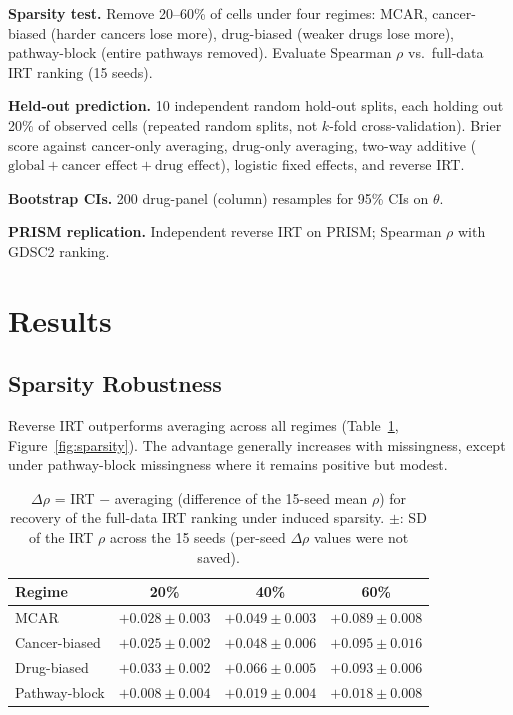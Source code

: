 \documentclass[11pt]{article}
\begin{document}
\textbf{Sparsity test.} Remove 20--60\% of cells under four regimes: MCAR, cancer-biased (harder cancers lose more), drug-biased (weaker drugs lose more), pathway-block (entire pathways removed). Evaluate Spearman $\rho$ vs.\ full-data IRT ranking (15 seeds).

\textbf{Held-out prediction.} 10 independent random hold-out splits, each holding out 20\% of observed cells (repeated random splits, not $k$-fold cross-validation). Brier score against cancer-only averaging, drug-only averaging, two-way additive ($\text{global} + \text{cancer effect} + \text{drug effect}$), logistic fixed effects, and reverse IRT.

\textbf{Bootstrap CIs.} 200 drug-panel (column) resamples for 95\% CIs on $\theta$.

\textbf{PRISM replication.} Independent reverse IRT on PRISM; Spearman $\rho$ with GDSC2 ranking.

\section{Results}

\subsection{Sparsity Robustness}

Reverse IRT outperforms averaging across all regimes (Table~\ref{tab:sparsity}, Figure~\ref{fig:sparsity}). The advantage generally increases with missingness, except under pathway-block missingness where it remains positive but modest.

\begin{table}[ht]
\centering
\caption{$\Delta\rho$ = IRT $-$ averaging (difference of the 15-seed mean $\rho$) for recovery of the full-data IRT ranking under induced sparsity. $\pm$: SD of the IRT $\rho$ across the 15 seeds (per-seed $\Delta\rho$ values were not saved).}
\label{tab:sparsity}
\small
\begin{tabular}{lccc}
\toprule
Regime & 20\% & 40\% & 60\% \\
\midrule
MCAR & $+0.028 \pm 0.003$ & $+0.049 \pm 0.003$ & $+0.089 \pm 0.008$ \\
Cancer-biased & $+0.025 \pm 0.002$ & $+0.048 \pm 0.006$ & $+0.095 \pm 0.016$ \\
Drug-biased & $+0.033 \pm 0.002$ & $+0.066 \pm 0.005$ & $+0.093 \pm 0.006$ \\
Pathway-block & $+0.008 \pm 0.004$ & $+0.019 \pm 0.004$ & $+0.018 \pm 0.008$ \\
\bottomrule
\end{tabular}
\end{table}
\end{document}

